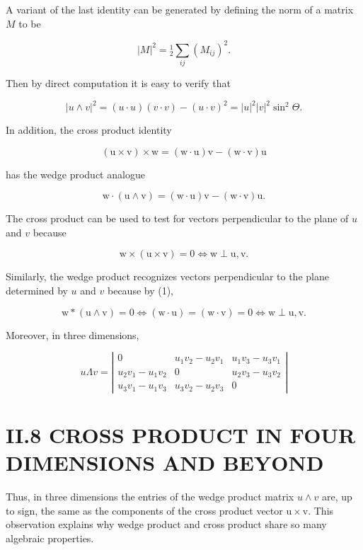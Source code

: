 \begin{CJK}{UTF8}{gbsn}
A variant of the last identity can be generated by defining the norm of a matrix $M$ to be

$$
|M|^{2}={ }_{2}^{1} \sum_{i j}\left(M_{i j}\right)^{2} .
$$

Then by direct computation it is easy to verify that

$$
|u \wedge v|^{2}=(u \cdot u)(v \cdot v)-(u \cdot v)^{2}=|u|^{2}|v|^{2} \sin ^{2} \Theta .
$$

In addition, the cross product identity

$$
(\mathrm{u} \times \mathrm{v}) \times \mathrm{w}=(\mathrm{w} \cdot \mathrm{u}) \mathrm{v}-(\mathrm{w} \cdot \mathrm{v}) \mathrm{u}
$$

has the wedge product analogue

$$
\mathrm{w} \cdot(\mathrm{u} \wedge \mathrm{v})=(\mathrm{w} \cdot \mathrm{u}) \mathrm{v}-(\mathrm{w} \cdot \mathrm{v}) \mathrm{u} .
$$

The cross product can be used to test for vectors perpendicular to the plane of $u$ and $v$ because

$$
\mathrm{w} \times(\mathrm{u} \times \mathrm{v})=0 \Leftrightarrow \mathrm{w} \perp \mathrm{u}, \mathrm{v} .
$$

Similarly, the wedge product recognizes vectors perpendicular to the plane determined by $u$ and $v$ because by (1),

$$
\mathrm{w} *(\mathrm{u} \wedge \mathrm{v})=0 \Leftrightarrow(\mathrm{w} \cdot \mathrm{u})=(\mathrm{w} \cdot \mathrm{v})=0 \Leftrightarrow \mathrm{w} \perp \mathrm{u}, \mathrm{v} .
$$

Moreover, in three dimensions,

$$
u \Lambda v=\left|\begin{array}{ccc}
0 & u_{1} v_{2}-u_{2} v_{1} & u_{1} v_{3}-u_{3} v_{1} \\
u_{2} v_{1}-u_{1} v_{2} & 0 & u_{2} v_{3}-u_{3} v_{2} \\
u_{3} v_{1}-u_{1} v_{3} & u_{3} v_{2}-u_{2} v_{3} & 0
\end{array}\right|
$$

\section{II.8 CROSS PRODUCT IN FOUR DIMENSIONS AND BEYOND}
Thus, in three dimensions the entries of the wedge product matrix $u \wedge v$ are, up to sign, the same as the components of the cross product vector $\mathrm{u} \times \mathrm{v}$. This observation explains why wedge product and cross product share so many algebraic properties.


\end{CJK}

